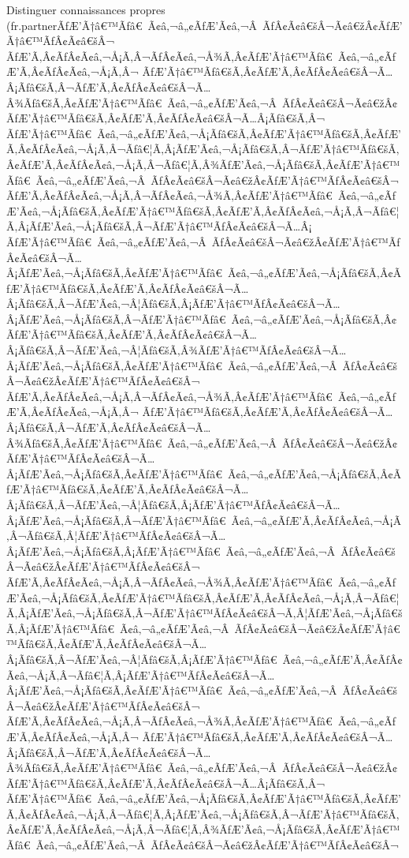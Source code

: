 \documentclass{gemoc} %
\begin{document}
Distinguer connaissances propres (fr.partnerÃƒÆ’Ã†â€™Ãƒâ€ Ã¢â‚¬â„¢ÃƒÆ’Ã¢â‚¬Â ÃƒÂ¢Ã¢â€šÂ¬Ã¢â€žÂ¢ÃƒÆ’Ã†â€™ÃƒÂ¢Ã¢â€šÂ¬ ÃƒÆ’Ã‚Â¢ÃƒÂ¢Ã¢â‚¬Å¡Ã‚Â¬ÃƒÂ¢Ã¢â‚¬Å¾Ã‚Â¢ÃƒÆ’Ã†â€™Ãƒâ€ Ã¢â‚¬â„¢ÃƒÆ’Ã‚Â¢ÃƒÂ¢Ã¢â‚¬Å¡Ã‚Â¬ ÃƒÆ’Ã†â€™Ãƒâ€šÃ‚Â¢ÃƒÆ’Ã‚Â¢ÃƒÂ¢Ã¢â€šÂ¬Ã…Â¡Ãƒâ€šÃ‚Â¬ÃƒÆ’Ã‚Â¢ÃƒÂ¢Ã¢â€šÂ¬Ã…Â¾Ãƒâ€šÃ‚Â¢ÃƒÆ’Ã†â€™Ãƒâ€ Ã¢â‚¬â„¢ÃƒÆ’Ã¢â‚¬Â ÃƒÂ¢Ã¢â€šÂ¬Ã¢â€žÂ¢ÃƒÆ’Ã†â€™Ãƒâ€šÃ‚Â¢ÃƒÆ’Ã‚Â¢ÃƒÂ¢Ã¢â€šÂ¬Ã…Â¡Ãƒâ€šÃ‚Â¬ ÃƒÆ’Ã†â€™Ãƒâ€ Ã¢â‚¬â„¢ÃƒÆ’Ã¢â‚¬Å¡Ãƒâ€šÃ‚Â¢ÃƒÆ’Ã†â€™Ãƒâ€šÃ‚Â¢ÃƒÆ’Ã‚Â¢ÃƒÂ¢Ã¢â‚¬Å¡Ã‚Â¬Ãƒâ€¦Ã‚Â¡ÃƒÆ’Ã¢â‚¬Å¡Ãƒâ€šÃ‚Â¬ÃƒÆ’Ã†â€™Ãƒâ€šÃ‚Â¢ÃƒÆ’Ã‚Â¢ÃƒÂ¢Ã¢â‚¬Å¡Ã‚Â¬Ãƒâ€¦Ã‚Â¾ÃƒÆ’Ã¢â‚¬Å¡Ãƒâ€šÃ‚Â¢ÃƒÆ’Ã†â€™Ãƒâ€ Ã¢â‚¬â„¢ÃƒÆ’Ã¢â‚¬Â ÃƒÂ¢Ã¢â€šÂ¬Ã¢â€žÂ¢ÃƒÆ’Ã†â€™ÃƒÂ¢Ã¢â€šÂ¬ ÃƒÆ’Ã‚Â¢ÃƒÂ¢Ã¢â‚¬Å¡Ã‚Â¬ÃƒÂ¢Ã¢â‚¬Å¾Ã‚Â¢ÃƒÆ’Ã†â€™Ãƒâ€ Ã¢â‚¬â„¢ÃƒÆ’Ã¢â‚¬Å¡Ãƒâ€šÃ‚Â¢ÃƒÆ’Ã†â€™Ãƒâ€šÃ‚Â¢ÃƒÆ’Ã‚Â¢ÃƒÂ¢Ã¢â‚¬Å¡Ã‚Â¬Ãƒâ€¦Ã‚Â¡ÃƒÆ’Ã¢â‚¬Å¡Ãƒâ€šÃ‚Â¬ÃƒÆ’Ã†â€™ÃƒÂ¢Ã¢â€šÂ¬Ã…Â¡ ÃƒÆ’Ã†â€™Ãƒâ€ Ã¢â‚¬â„¢ÃƒÆ’Ã¢â‚¬Â ÃƒÂ¢Ã¢â€šÂ¬Ã¢â€žÂ¢ÃƒÆ’Ã†â€™ÃƒÂ¢Ã¢â€šÂ¬Ã…Â¡ÃƒÆ’Ã¢â‚¬Å¡Ãƒâ€šÃ‚Â¢ÃƒÆ’Ã†â€™Ãƒâ€ Ã¢â‚¬â„¢ÃƒÆ’Ã¢â‚¬Å¡Ãƒâ€šÃ‚Â¢ÃƒÆ’Ã†â€™Ãƒâ€šÃ‚Â¢ÃƒÆ’Ã‚Â¢ÃƒÂ¢Ã¢â€šÂ¬Ã…Â¡Ãƒâ€šÃ‚Â¬ÃƒÆ’Ã¢â‚¬Â¦Ãƒâ€šÃ‚Â¡ÃƒÆ’Ã†â€™ÃƒÂ¢Ã¢â€šÂ¬Ã…Â¡ÃƒÆ’Ã¢â‚¬Å¡Ãƒâ€šÃ‚Â¬ÃƒÆ’Ã†â€™Ãƒâ€ Ã¢â‚¬â„¢ÃƒÆ’Ã¢â‚¬Å¡Ãƒâ€šÃ‚Â¢ÃƒÆ’Ã†â€™Ãƒâ€šÃ‚Â¢ÃƒÆ’Ã‚Â¢ÃƒÂ¢Ã¢â€šÂ¬Ã…Â¡Ãƒâ€šÃ‚Â¬ÃƒÆ’Ã¢â‚¬Â¦Ãƒâ€šÃ‚Â¾ÃƒÆ’Ã†â€™ÃƒÂ¢Ã¢â€šÂ¬Ã…Â¡ÃƒÆ’Ã¢â‚¬Å¡Ãƒâ€šÃ‚Â¢ÃƒÆ’Ã†â€™Ãƒâ€ Ã¢â‚¬â„¢ÃƒÆ’Ã¢â‚¬Â ÃƒÂ¢Ã¢â€šÂ¬Ã¢â€žÂ¢ÃƒÆ’Ã†â€™ÃƒÂ¢Ã¢â€šÂ¬ ÃƒÆ’Ã‚Â¢ÃƒÂ¢Ã¢â‚¬Å¡Ã‚Â¬ÃƒÂ¢Ã¢â‚¬Å¾Ã‚Â¢ÃƒÆ’Ã†â€™Ãƒâ€ Ã¢â‚¬â„¢ÃƒÆ’Ã‚Â¢ÃƒÂ¢Ã¢â‚¬Å¡Ã‚Â¬ ÃƒÆ’Ã†â€™Ãƒâ€šÃ‚Â¢ÃƒÆ’Ã‚Â¢ÃƒÂ¢Ã¢â€šÂ¬Ã…Â¡Ãƒâ€šÃ‚Â¬ÃƒÆ’Ã‚Â¢ÃƒÂ¢Ã¢â€šÂ¬Ã…Â¾Ãƒâ€šÃ‚Â¢ÃƒÆ’Ã†â€™Ãƒâ€ Ã¢â‚¬â„¢ÃƒÆ’Ã¢â‚¬Â ÃƒÂ¢Ã¢â€šÂ¬Ã¢â€žÂ¢ÃƒÆ’Ã†â€™ÃƒÂ¢Ã¢â€šÂ¬Ã…Â¡ÃƒÆ’Ã¢â‚¬Å¡Ãƒâ€šÃ‚Â¢ÃƒÆ’Ã†â€™Ãƒâ€ Ã¢â‚¬â„¢ÃƒÆ’Ã¢â‚¬Å¡Ãƒâ€šÃ‚Â¢ÃƒÆ’Ã†â€™Ãƒâ€šÃ‚Â¢ÃƒÆ’Ã‚Â¢ÃƒÂ¢Ã¢â€šÂ¬Ã…Â¡Ãƒâ€šÃ‚Â¬ÃƒÆ’Ã¢â‚¬Â¦Ãƒâ€šÃ‚Â¡ÃƒÆ’Ã†â€™ÃƒÂ¢Ã¢â€šÂ¬Ã…Â¡ÃƒÆ’Ã¢â‚¬Å¡Ãƒâ€šÃ‚Â¬ÃƒÆ’Ã†â€™Ãƒâ€ Ã¢â‚¬â„¢ÃƒÆ’Ã‚Â¢ÃƒÂ¢Ã¢â‚¬Å¡Ã‚Â¬Ãƒâ€šÃ‚Â¦ÃƒÆ’Ã†â€™ÃƒÂ¢Ã¢â€šÂ¬Ã…Â¡ÃƒÆ’Ã¢â‚¬Å¡Ãƒâ€šÃ‚Â¡ÃƒÆ’Ã†â€™Ãƒâ€ Ã¢â‚¬â„¢ÃƒÆ’Ã¢â‚¬Â ÃƒÂ¢Ã¢â€šÂ¬Ã¢â€žÂ¢ÃƒÆ’Ã†â€™ÃƒÂ¢Ã¢â€šÂ¬ ÃƒÆ’Ã‚Â¢ÃƒÂ¢Ã¢â‚¬Å¡Ã‚Â¬ÃƒÂ¢Ã¢â‚¬Å¾Ã‚Â¢ÃƒÆ’Ã†â€™Ãƒâ€ Ã¢â‚¬â„¢ÃƒÆ’Ã¢â‚¬Å¡Ãƒâ€šÃ‚Â¢ÃƒÆ’Ã†â€™Ãƒâ€šÃ‚Â¢ÃƒÆ’Ã‚Â¢ÃƒÂ¢Ã¢â‚¬Å¡Ã‚Â¬Ãƒâ€¦Ã‚Â¡ÃƒÆ’Ã¢â‚¬Å¡Ãƒâ€šÃ‚Â¬ÃƒÆ’Ã†â€™ÃƒÂ¢Ã¢â€šÂ¬Ã‚Â¦ÃƒÆ’Ã¢â‚¬Å¡Ãƒâ€šÃ‚Â¡ÃƒÆ’Ã†â€™Ãƒâ€ Ã¢â‚¬â„¢ÃƒÆ’Ã¢â‚¬Â ÃƒÂ¢Ã¢â€šÂ¬Ã¢â€žÂ¢ÃƒÆ’Ã†â€™Ãƒâ€šÃ‚Â¢ÃƒÆ’Ã‚Â¢ÃƒÂ¢Ã¢â€šÂ¬Ã…Â¡Ãƒâ€šÃ‚Â¬ÃƒÆ’Ã¢â‚¬Â¦Ãƒâ€šÃ‚Â¡ÃƒÆ’Ã†â€™Ãƒâ€ Ã¢â‚¬â„¢ÃƒÆ’Ã‚Â¢ÃƒÂ¢Ã¢â‚¬Å¡Ã‚Â¬Ãƒâ€¦Ã‚Â¡ÃƒÆ’Ã†â€™ÃƒÂ¢Ã¢â€šÂ¬Ã…Â¡ÃƒÆ’Ã¢â‚¬Å¡Ãƒâ€šÃ‚Â¢ÃƒÆ’Ã†â€™Ãƒâ€ Ã¢â‚¬â„¢ÃƒÆ’Ã¢â‚¬Â ÃƒÂ¢Ã¢â€šÂ¬Ã¢â€žÂ¢ÃƒÆ’Ã†â€™ÃƒÂ¢Ã¢â€šÂ¬ ÃƒÆ’Ã‚Â¢ÃƒÂ¢Ã¢â‚¬Å¡Ã‚Â¬ÃƒÂ¢Ã¢â‚¬Å¾Ã‚Â¢ÃƒÆ’Ã†â€™Ãƒâ€ Ã¢â‚¬â„¢ÃƒÆ’Ã‚Â¢ÃƒÂ¢Ã¢â‚¬Å¡Ã‚Â¬ ÃƒÆ’Ã†â€™Ãƒâ€šÃ‚Â¢ÃƒÆ’Ã‚Â¢ÃƒÂ¢Ã¢â€šÂ¬Ã…Â¡Ãƒâ€šÃ‚Â¬ÃƒÆ’Ã‚Â¢ÃƒÂ¢Ã¢â€šÂ¬Ã…Â¾Ãƒâ€šÃ‚Â¢ÃƒÆ’Ã†â€™Ãƒâ€ Ã¢â‚¬â„¢ÃƒÆ’Ã¢â‚¬Â ÃƒÂ¢Ã¢â€šÂ¬Ã¢â€žÂ¢ÃƒÆ’Ã†â€™Ãƒâ€šÃ‚Â¢ÃƒÆ’Ã‚Â¢ÃƒÂ¢Ã¢â€šÂ¬Ã…Â¡Ãƒâ€šÃ‚Â¬ ÃƒÆ’Ã†â€™Ãƒâ€ Ã¢â‚¬â„¢ÃƒÆ’Ã¢â‚¬Å¡Ãƒâ€šÃ‚Â¢ÃƒÆ’Ã†â€™Ãƒâ€šÃ‚Â¢ÃƒÆ’Ã‚Â¢ÃƒÂ¢Ã¢â‚¬Å¡Ã‚Â¬Ãƒâ€¦Ã‚Â¡ÃƒÆ’Ã¢â‚¬Å¡Ãƒâ€šÃ‚Â¬ÃƒÆ’Ã†â€™Ãƒâ€šÃ‚Â¢ÃƒÆ’Ã‚Â¢ÃƒÂ¢Ã¢â‚¬Å¡Ã‚Â¬Ãƒâ€¦Ã‚Â¾ÃƒÆ’Ã¢â‚¬Å¡Ãƒâ€šÃ‚Â¢ÃƒÆ’Ã†â€™Ãƒâ€ Ã¢â‚¬â„¢ÃƒÆ’Ã¢â‚¬Â ÃƒÂ¢Ã¢â€šÂ¬Ã¢â€žÂ¢ÃƒÆ’Ã†â€™ÃƒÂ¢Ã¢â€šÂ¬ 
\end{document}
